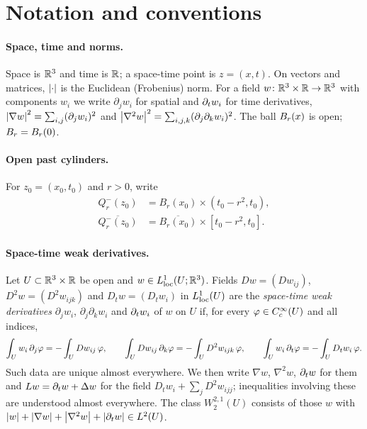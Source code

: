 \documentclass[11pt,letterpaper]{article}
\numberwithin{equation}{section}
\theoremstyle{plain}
\theoremstyle{definition}
\theoremstyle{remark}
\begin{document}
\section{Notation and conventions}\label{sec:notation}

\paragraph{Space, time and norms.}
Space is $\mathbb{R}^3$ and time is $\mathbb{R}$; a space-time point is $z=(x,t)$. On
vectors and matrices, $\left\lvert \cdot\right\rvert$ is the Euclidean (Frobenius) norm. For a
field $w\colon\mathbb{R}^3\times\mathbb{R}\to\mathbb{R}^3$ with components $w_i$ we write
$\partial_j w_i$ for spatial and $\partial_t w_i$ for time derivatives,
$\left\lvert \nabla w\right\rvert^2=\sum_{i,j}(\partial_j w_i)^2$ and
$\left\lvert \nabla^2 w\right\rvert^2=\sum_{i,j,k}(\partial_j\partial_k w_i)^2$.
The ball $B_{r}(x)$ is open; $B_r=B_{r}(0)$.

\paragraph{Open past cylinders.}
For $z_0=(x_0,t_0)$ and $r>0$, write
\[
\begin{aligned}
 Q_r^-(z_0) &= B_r(x_0)\times(t_0-r^2,t_0),\\
 \overline{Q_r^-(z_0)} &= \overline{B_r(x_0)}\times[t_0-r^2,t_0].
\end{aligned}
\]

\paragraph{Space-time weak derivatives.}
Let $U\subset\mathbb{R}^3\times\mathbb{R}$ be open and $w\in L^{1}_{\mathrm{loc}}(U;\mathbb{R}^3)$. Fields
$Dw=(Dw_{ij})$, $D^2w=(D^2w_{ijk})$ and $D_tw=(D_tw_i)$ in $L^{1}_{\mathrm{loc}}(U)$ are
the \emph{space-time weak derivatives} $\partial_j w_i$,
$\partial_j\partial_k w_i$ and $\partial_t w_i$ of $w$ on $U$ if, for every
$\varphi\in C_c^\infty(U)$ and all indices,
\[
\int_U w_i\,\partial_j\varphi=-\int_U Dw_{ij}\,\varphi,\qquad
\int_U Dw_{ij}\,\partial_k\varphi=-\int_U D^2w_{ijk}\,\varphi,\qquad
\int_U w_i\,\partial_t\varphi=-\int_U D_tw_i\,\varphi .
\]
Such data are unique almost everywhere. We then write $\nabla w$,
$\nabla^2 w$, $\partial_t w$ for them and $L w=\partial_t w+\Delta w$ for the field
$D_tw_i+\sum_j D^2w_{ijj}$; inequalities involving these are understood almost
everywhere. The class $W^{2,1}_2(U)$ consists of those $w$ with
$\left\lvert w\right\rvert+\left\lvert \nabla w\right\rvert+\left\lvert \nabla^2w\right\rvert+\left\lvert \partial_t w\right\rvert\in L^2(U)$.
\end{document}
